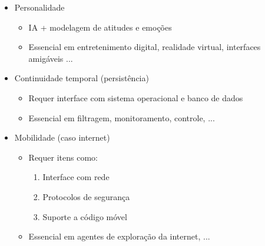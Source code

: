 \begin{frame} [allowframebreaks=0.9]
\begin{itemize}
                
    \item Personalidade
    
    \begin{itemize}
      \item IA + modelagem de atitudes e emoções
      \item Essencial em entretenimento digital, realidade virtual, interfaces amigáveis ... 
    \end{itemize}
    
    \item Continuidade temporal (persistência)
    \begin{itemize}
      \item Requer interface com sistema operacional e banco de dados
    \item Essencial em filtragem, monitoramento, controle, ...
    \end{itemize}
    
    
 \item Mobilidade (caso internet)
  \begin{itemize}
     \item Requer itens como:
     \begin{enumerate}
       \item Interface com rede
       \item Protocolos de segurança
       \item Suporte a código móvel
     \end{enumerate}

    \item Essencial em agentes de exploração da internet, ...
         
     \end{itemize}      
                  
    \end{itemize}
 
\end{frame}


